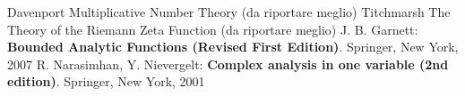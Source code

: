 \begin{thebibliography}{widest entry}
   Davenport Multiplicative Number Theory (da riportare meglio)
   Titchmarsh The Theory of the Riemann Zeta Function (da riportare meglio)
   J. B. Garnett: \textbf{Bounded Analytic Functions (Revised First Edition)}. Springer, New York, 2007
   R. Narasimhan, Y. Nievergelt: \textbf{Complex analysis in one variable (2nd edition)}. Springer, New York, 2001
\end{thebibliography}
